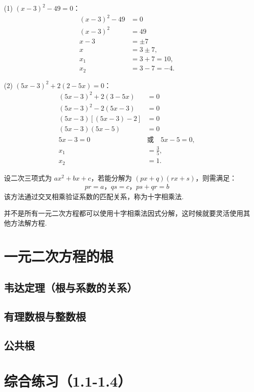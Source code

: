 \documentclass[lang=cn, 10pt, titlestyle=hang, oneside]{elegantbook}
\begin{document}
\begin{solution}
\begin{multicols}{2}
(1) \((x-3)^2-49=0\)：
\begin{align*}
(x-3)^2 - 49 &= 0 \\
(x-3)^2 &= 49 \\
x-3 &= \pm 7 \\
x &= 3 \pm 7, \\
x_1 &= 3 + 7 = 10, \\
x_2 &= 3 - 7 = -4.
\end{align*}

(2) \((5x-3)^2+2(2-5x)=0\)：
\begin{align*}
(5x-3)^2 + 2(3-5x) &= 0 \\
(5x-3)^2 - 2(5x-3) &= 0 \\
(5x-3)\left[(5x-3) - 2\right] &= 0 \\
(5x-3)(5x-5) &= 0 \\
5x-3 = 0 \quad &\text{或} \quad 5x-5 = 0, \\
x_1 &= \frac{3}{5}, \\
x_2 &= 1.
\end{align*}
\end{multicols}
\end{solution}

设二次三项式为 $ax^2 + bx + c$，若能分解为 $(px + q)(rx + s)$，则需满足：
\begin{align*}
pr = a，
qs = c，ps + qr = b
\end{align*}
该方法通过交叉相乘验证系数的匹配关系，称为十字相乘法.
\par
并不是所有一元二次方程都可以使用十字相乘法因式分解，这时候就要灵活使用其他方法解方程.

\section{一元二次方程的根}
\subsection{韦达定理（根与系数的关系）}

\subsection{有理数根与整数根}

\subsection{公共根}
\section{综合练习（1.1-1.4）}
\end{document}
